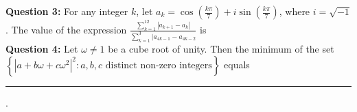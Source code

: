 \documentclass[journal,12pt,twocolumn]{IEEEtran}
\theoremstyle{remark}
\begin{document}
\textbf{Question 3:} For any integer $k$, let $a_k = \cos(\frac{k\pi}7) + i\sin(\frac{k\pi}7)$, where
$i = \sqrt{-1}$. The value of the expression $\frac {\sum_{k=1}^{12} |a_{k+1} - a_k|} {\sum_{k=1}^{3} |a_{4k-1} - a_{4k-2}}$ is
\hspace*{\fill} {\color{magenta}} \\


\textbf{Question 4:} Let $\omega \ne 1$ be a cube root of unity. Then the minimum of the set $\left\{|a + b\omega + c\omega^2|^2: a,b,c \text{ distinct non-zero integers} \right\}$ equals \rule{1cm}{0.15mm}.
\hspace*{\fill} {\color{magenta}} \\
\end{document}
